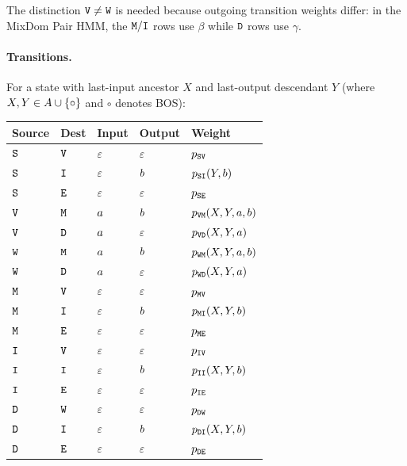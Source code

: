 The distinction ${\tt V} \neq {\tt W}$ is needed because outgoing transition weights differ:
in the MixDom Pair HMM, the ${\tt M}/{\tt I}$ rows use $\beta$ while ${\tt D}$ rows use $\gamma$.

\paragraph{Transitions.}
For a state with last-input ancestor $X$ and last-output descendant $Y$
(where $X,Y \in A \cup \{\circ\}$ and $\circ$ denotes BOS):

\medskip
\begin{tabular}{lllll}
Source & Dest & Input & Output & Weight \\
\hline
${\tt S}$ & ${\tt V}$ & $\varepsilon$ & $\varepsilon$ & $p_{{\tt S}{\tt V}}$ \\
${\tt S}$ & ${\tt I}$ & $\varepsilon$ & $b$ & $p_{{\tt S}{\tt I}}(Y,b)$ \\
${\tt S}$ & ${\tt E}$ & $\varepsilon$ & $\varepsilon$ & $p_{{\tt S}{\tt E}}$ \\
\hline
${\tt V}$ & ${\tt M}$ & $a$ & $b$ & $p_{{\tt V}{\tt M}}(X,Y,a,b)$ \\
${\tt V}$ & ${\tt D}$ & $a$ & $\varepsilon$ & $p_{{\tt V}{\tt D}}(X,Y,a)$ \\
\hline
${\tt W}$ & ${\tt M}$ & $a$ & $b$ & $p_{{\tt W}{\tt M}}(X,Y,a,b)$ \\
${\tt W}$ & ${\tt D}$ & $a$ & $\varepsilon$ & $p_{{\tt W}{\tt D}}(X,Y,a)$ \\
\hline
${\tt M}$ & ${\tt V}$ & $\varepsilon$ & $\varepsilon$ & $p_{{\tt M}{\tt V}}$ \\
${\tt M}$ & ${\tt I}$ & $\varepsilon$ & $b$ & $p_{{\tt M}{\tt I}}(X,Y,b)$ \\
${\tt M}$ & ${\tt E}$ & $\varepsilon$ & $\varepsilon$ & $p_{{\tt M}{\tt E}}$ \\
\hline
${\tt I}$ & ${\tt V}$ & $\varepsilon$ & $\varepsilon$ & $p_{{\tt I}{\tt V}}$ \\
${\tt I}$ & ${\tt I}$ & $\varepsilon$ & $b$ & $p_{{\tt I}{\tt I}}(X,Y,b)$ \\
${\tt I}$ & ${\tt E}$ & $\varepsilon$ & $\varepsilon$ & $p_{{\tt I}{\tt E}}$ \\
\hline
${\tt D}$ & ${\tt W}$ & $\varepsilon$ & $\varepsilon$ & $p_{{\tt D}{\tt W}}$ \\
${\tt D}$ & ${\tt I}$ & $\varepsilon$ & $b$ & $p_{{\tt D}{\tt I}}(X,Y,b)$ \\
${\tt D}$ & ${\tt E}$ & $\varepsilon$ & $\varepsilon$ & $p_{{\tt D}{\tt E}}$
\end{tabular}

